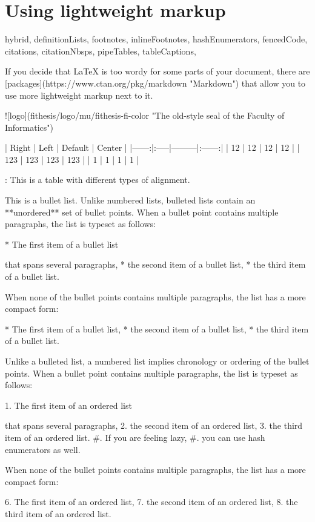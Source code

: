 \documentclass[
  digital,     %
  oneside,     %
  nosansbold,  %
  nocolorbold, %
  lof,         %
  lot,         %
]{fithesis4}
\begin{document}
\chapter{Using lightweight markup}
\begin{markdown*}{%
  hybrid,
  definitionLists,
  footnotes,
  inlineFootnotes,
  hashEnumerators,
  fencedCode,
  citations,
  citationNbsps,
  pipeTables,
  tableCaptions,
}

If you decide that \LaTeX{} is too wordy for some parts of your
document, there are [packages](https://www.ctan.org/pkg/markdown
"Markdown") that allow you to use more lightweight markup next
to it.

 ![logo](fithesis/logo/mu/fithesis-fi-color "The old-style seal of
         the Faculty of Informatics")

| Right | Left | Default | Center |
|------:|:-----|---------|:------:|
|    12 | 12   | 12      |   12   |
|   123 | 123  | 123     |   123  |
|     1 | 1    | 1       |    1   |

: This is a table with different types of alignment.

This is a bullet list. Unlike numbered lists, bulleted lists
contain an **unordered** set of bullet points. When a bullet point
contains multiple paragraphs, the list is typeset as follows:

  * The first item of a bullet list

    that spans several paragraphs,
  * the second item of a bullet list,
  * the third item of a bullet list.

When none of the bullet points contains multiple paragraphs, the
list has a more compact form:

  * The first item of a bullet list,
  * the second item of a bullet list,
  * the third item of a bullet list.

Unlike a bulleted list, a numbered list implies chronology or
ordering of the bullet points. When a bullet point
contains multiple paragraphs, the list is typeset as follows:

  1. The first item of an ordered list

     that spans several paragraphs,
  2. the second item of an ordered list,
  3. the third item of an ordered list.
  #. If you are feeling lazy,
  #. you can use hash enumerators as well.

When none of the bullet points contains multiple paragraphs, the
list has a more compact form:

  6. The first item of an ordered list,
  7. the second item of an ordered list,
  8. the third item of an ordered list.


\end{markdown*}
\end{document}
